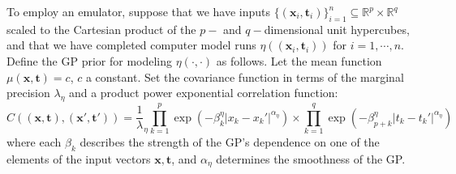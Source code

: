 \documentclass[12pt]{article}
\begin{document}

To employ an emulator, suppose that we have inputs $\{(\mathbf x_i,\mathbf t_i)\}_{i=1}^n\subseteq \mathbb R^p\times \mathbb R^q$ scaled to the Cartesian product of the $p-$ and $q-$dimensional unit hypercubes, and that we have completed computer model runs 
%
$\eta\left((\mathbf x_i,\mathbf t_i)\right)$ for $i=1,\cdots,n.$
%
%
%
%
Define the GP prior for modeling $\eta(\cdot,\cdot)$ as follows. 
%
Let the mean function $\mu(\mathbf x,\mathbf t)=c$, $c$ a constant. 
%
Set the covariance function in terms of the marginal precision $\lambda_\eta$ and a product power exponential correlation function:
%
\begin{equation}\label{eq:Hig_cov}
C((\mathbf x,\mathbf t),(\mathbf x',\mathbf t')) = \frac 1\lambda_\eta \prod_{k=1}^{p}
\exp \left(-\beta^\eta_k|x_k-x_k'|^{\alpha_\eta}\right) \times
\prod_{k=1}^{q}
\exp \left(-\beta^\eta_{p+k}|t_k-t_k'|^{\alpha_\eta}\right)
\end{equation}
%
where each $\beta_k$ describes the strength of the GP's dependence on one of the elements of the input vectors $\mathbf x,\mathbf t$, and $\alpha_\eta$ determines the smoothness of the GP. 
\end{document}
